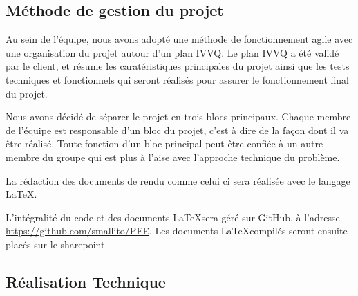 
\subsection {Méthode de gestion du projet}

Au sein de l'équipe, nous avons adopté une méthode de fonctionnement agile avec une organisation du projet autour d'un plan IVVQ.
Le plan IVVQ a été validé par le client, et résume les caratéristiques principales du projet ainsi que les tests techniques et fonctionnels qui seront réalisés pour assurer le fonctionnement final du projet.


Nous avons décidé de séparer le projet en trois blocs principaux.
Chaque membre de l'équipe est responsable d'un bloc du projet, c'est à dire de la façon dont il va être réalisé.
Toute fonction d'un bloc principal peut être confiée à un autre membre du groupe qui est plus à l'aise avec l'approche technique du problème.


La rédaction des documents de rendu comme celui ci sera réalisée avec le langage \LaTeX.


L'intégralité du code et des documents \LaTeX sera géré sur GitHub, à l'adresse \url{https://github.com/smallito/PFE}.
Les documents \LaTeX compilés seront ensuite placés sur le sharepoint.



\subsection {Réalisation Technique}


